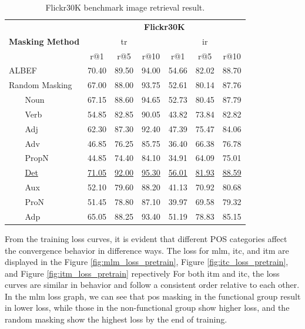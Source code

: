 \begin{table}[h]
    \centering
    \caption{Flickr30K benchmark image retrieval result.}
    \label{tab:flickr30k}
    \begin{adjustbox}{width=0.8\textwidth}
        \begin{tabular}{ll|ccc|ccc}
            \hline
            \multicolumn{2}{c|}{\multirow{3}{*}{\textbf{Masking Method}}} & \multicolumn{6}{c}{\textbf{Flickr30K}} \\
            \multicolumn{2}{l|}{} & \multicolumn{3}{c|}{\acrshort{tr}} & \multicolumn{3}{c}{\acrshort{ir}} \\
            \multicolumn{2}{l|}{} & r@1 & r@5 & r@10 & r@1 & r@5 & r@10 \\
            \hline
            \multicolumn{2}{l|}{ALBEF} & 70.40 & 89.50 & 94.00 & 54.66 & 82.02 & 88.70 \\
            \hline
            \multicolumn{2}{l|}{Random Masking} & 67.00 & 88.00 & 93.75 & 52.61 & 80.14 & 87.76 \\
            \hline
            \rowcolor{green} \multirow{5}{*}{Non-function} & Noun & 67.15 & 88.60 & 94.65 & 52.73 & 80.45 & 87.79 \\
            & Verb & 54.85 & 82.85 & 90.05 & 43.82 & 73.84 & 82.82 \\
            & Adj & 62.30 & 87.30 & 92.40 & 47.39 & 75.47 & 84.06 \\
            & Adv & 46.85 & 76.25 & 85.75 & 36.40 & 66.38 & 76.78 \\
            & PropN & 44.85 & 74.40 & 84.10 & 34.91 & 64.09 & 75.01 \\
            \hline
            \rowcolor{green} \multirow{4}{*}{Function} & \underline{Det} & \underline{71.05} & \underline{92.00} & \underline{95.30} & \underline{56.01} & \underline{81.93} & \underline{88.59} \\
            & Aux  & 52.10 & 79.60 & 88.20 & 41.13 & 70.92 & 80.68 \\
            & ProN & 51.45 & 78.80 & 87.10 & 39.97 & 69.58 & 79.32 \\
            & Adp & 65.05 & 88.25 & 93.40 & 51.19 & 78.83 & 85.15 \\
            \hline
        \end{tabular}
    \end{adjustbox}
\end{table}

From the training loss curves, it is evident that different POS categories affect the convergence behavior in difference ways.
The loss for \acrshort{mlm}, \acrshort{itc}, and \acrshort{itm} are displayed in the Figure \ref{fig:mlm_loss_pretrain}, Figure \ref{fig:itc_loss_pretrain}, and Figure \ref{fig:itm_loss_pretrain} repectively
For both \acrshort{itm} and \acrshort{itc}, the loss curves are similar in behavior and follow a consistent order relative to each other.
In the \acrshort{mlm} loss graph, we can see that \acrshort{pos} masking in the functional group result in lower loss, while those in the non-functional group show higher loss, and the random masking show the highest loss by the end of training.

